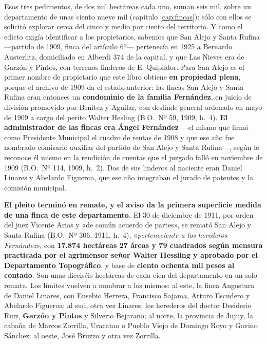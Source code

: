 Esos tres pedimentos, de dos mil hectáreas cada uno, suman seis mil, sobre un departamento de unas ciento nueve mil (capítulo \ref{cap:fincas}): sólo con ellos se solicitó explorar
cerca del cinco y medio por ciento del territorio. Y como el edicto exigía identificar a los propietarios, sabemos que San
Alejo y Santa Rufina —partido de 1909, finca del artículo 6º— pertenecía en 1925 a Bernardo
Austerlitz, domiciliado en Alberdi 374 de la capital, y que Las Nieves era de Garzón y
Pintos, con terrenos linderos de E. Quipildor. Para San Alejo es el primer nombre de propietario
que este libro obtiene \textbf{en propiedad plena}, porque el archivo de 1909 da el estado
anterior: las fincas San Alejo y Santa Rufina eran entonces un \textbf{condominio de la familia
Fernández}, en juicio de división promovido por Benítez y Aguilar, con
deslinde general ordenado en mayo de 1909 a cargo del perito Walter Hesling (B.O.\ Nº 59, 1909, h.\ 4). \textbf{El
administrador de las fincas era Ángel Fernández} ---el mismo que firmó
como Presidente Municipal el cuadro de rentas de 1908 y que ese año fue nombrado comisario
auxiliar del partido de San Alejo y Santa Rufina---, según lo reconoce él mismo en la rendición
de cuentas que el juzgado falló en noviembre de 1909 (B.O.\ Nº 114, 1909, h.\ 2). Dos de sus linderos al naciente eran
Daniel Linares y Abelardo Figueroa, que ese año
integraban el jurado de patentes y la comisión municipal.

\textbf{El pleito terminó en remate, y el aviso da la primera superficie medida de una finca de
este departamento.} El 30 de diciembre de 1911, por orden del juez Vicente Arias y «de común
acuerdo de partes», se remató San Alejo y Santa Rufina (B.O.\ Nº 306, 1911, h.\ 4), «\textit{perteneciente a los herederos
Fernández}», con \textbf{17.874 hectáreas 27 áreas y 79 cuadrados según
mensura practicada por el agrimensor señor Walter Hessling y aprobado por el Departamento
Topográfico}, y base de \textbf{ciento ochenta mil pesos al contado}. Son unas dieciséis
hectáreas de cada cien del departamento en un solo remate. Los límites vuelven a nombrar a los
mismos: al este, la finca Angostura de Daniel Linares, con Eusebio
Herrera, Francisco Sajama, Arturo Escudero y Abelardo Figueroa; al
sud, otra vez Linares, los herederos del doctor Desiderio Ruiz, \textbf{Garzón y Pintos} y
Silverio Bejarano; al norte, la provincia de Jujuy, la cabaña de Marcos Zorrilla, Uracatao o
Pueblo Viejo de Domingo Royo y Gavino Sánchez; al oeste, José Bruzzo y otra vez Zorrilla.

